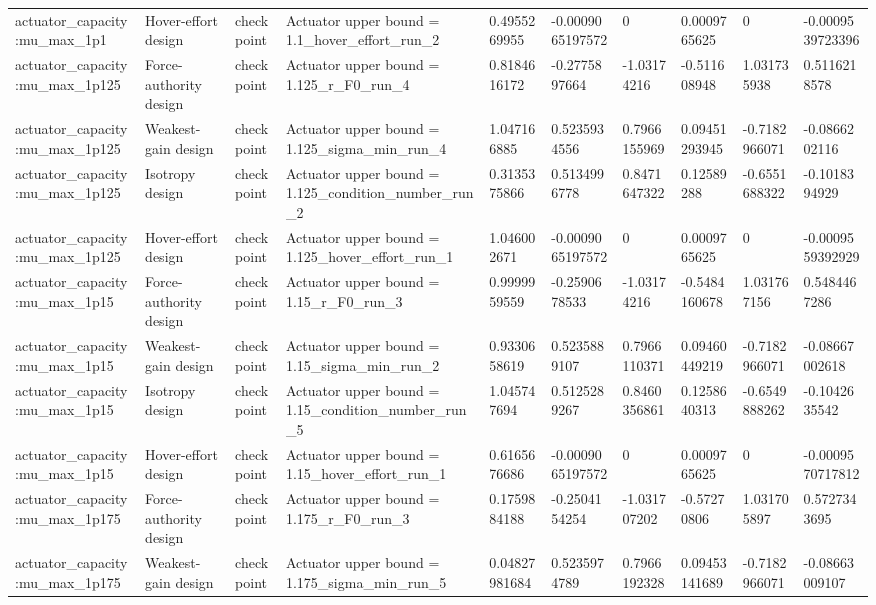 \begin{tabular}{@{}llllllllll@{}}
actuator\_capacity:mu\_max\_1p1 & Hover-effort design & checkpoint & Actuator upper bound = 1.1\_hover\_effort\_run\_2 & 0.4955269955 & -0.0009065197572 & 0 & 0.0009765625 & 0 & -0.0009539723396 \\
actuator\_capacity:mu\_max\_1p125 & Force-authority design & checkpoint & Actuator upper bound = 1.125\_r\_F0\_run\_4 & 0.8184616172 & -0.2775897664 & -1.03174216 & -0.511608948 & 1.031735938 & 0.5116218578 \\
actuator\_capacity:mu\_max\_1p125 & Weakest-gain design & checkpoint & Actuator upper bound = 1.125\_sigma\_min\_run\_4 & 1.047166885 & 0.5235934556 & 0.7966155969 & 0.09451293945 & -0.7182966071 & -0.0866202116 \\
actuator\_capacity:mu\_max\_1p125 & Isotropy design & checkpoint & Actuator upper bound = 1.125\_condition\_number\_run\_2 & 0.3135375866 & 0.5134996778 & 0.8471647322 & 0.12589288 & -0.6551688322 & -0.1018394929 \\
actuator\_capacity:mu\_max\_1p125 & Hover-effort design & checkpoint & Actuator upper bound = 1.125\_hover\_effort\_run\_1 & 1.046002671 & -0.0009065197572 & 0 & 0.0009765625 & 0 & -0.0009559392929 \\
actuator\_capacity:mu\_max\_1p15 & Force-authority design & checkpoint & Actuator upper bound = 1.15\_r\_F0\_run\_3 & 0.9999959559 & -0.2590678533 & -1.03174216 & -0.5484160678 & 1.031767156 & 0.5484467286 \\
actuator\_capacity:mu\_max\_1p15 & Weakest-gain design & checkpoint & Actuator upper bound = 1.15\_sigma\_min\_run\_2 & 0.9330658619 & 0.5235889107 & 0.7966110371 & 0.09460449219 & -0.7182966071 & -0.08667002618 \\
actuator\_capacity:mu\_max\_1p15 & Isotropy design & checkpoint & Actuator upper bound = 1.15\_condition\_number\_run\_5 & 1.045747694 & 0.5125289267 & 0.8460356861 & 0.1258640313 & -0.6549888262 & -0.1042635542 \\
actuator\_capacity:mu\_max\_1p15 & Hover-effort design & checkpoint & Actuator upper bound = 1.15\_hover\_effort\_run\_1 & 0.6165676686 & -0.0009065197572 & 0 & 0.0009765625 & 0 & -0.0009570717812 \\
actuator\_capacity:mu\_max\_1p175 & Force-authority design & checkpoint & Actuator upper bound = 1.175\_r\_F0\_run\_3 & 0.1759884188 & -0.2504154254 & -1.031707202 & -0.57270806 & 1.031705897 & 0.5727343695 \\
actuator\_capacity:mu\_max\_1p175 & Weakest-gain design & checkpoint & Actuator upper bound = 1.175\_sigma\_min\_run\_5 & 0.04827981684 & 0.5235974789 & 0.7966192328 & 0.09453141689 & -0.7182966071 & -0.08663009107 \\

\end{tabular}
